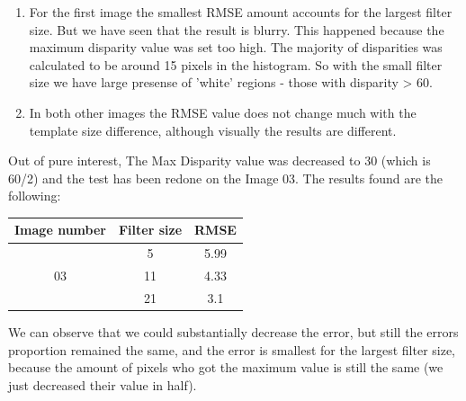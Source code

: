 \documentclass[a4paper]{iacas}
\begin{document}
\begin{enumerate}
\item For the first image the smallest RMSE amount accounts for the largest filter size. But we have seen that the result is blurry. This happened because the maximum disparity value was set too high. The majority of disparities was calculated to be around 15 pixels in the histogram. So with the small filter size we have large presense of 'white' regions - those with disparity > 60.
\item In both other images the RMSE value does not change much with the template size difference, although visually the results are different.
\end{enumerate}

Out of pure interest, The Max Disparity value was decreased to 30 (which is 60/2) and the test has been redone on the Image 03. The results found are the following:

\begin{table}[]
\begin{tabular}{|c|c|c|}
\hline
Image number        & Filter size & RMSE  \\ \hline
\multirow{3}{*}{03} & 5           & 5.99  \\ \cline{2-3} 
                    & 11          & 4.33  \\ \cline{2-3} 
                    & 21          & 3.1  \\ \hline
\end{tabular}
\end{table}
We can observe that we could substantially decrease the error, but still the errors proportion remained the same, and the error is smallest for the largest filter size, because the amount of pixels who got the maximum value is still the same (we just decreased their value in half).
\end{document}
